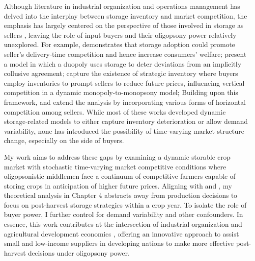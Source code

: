 Although literature in industrial organization and operations management has delved into the interplay between storage inventory and market competition, the emphasis has largely centered on the perspective of those involved in storage as sellers \citep{leng2005game}, leaving the role of input buyers and their oligopsony power relatively unexplored. For example, \cite{li1992role} demonstrates that storage adoption could promote seller's delivery-time competition and hence increase consumers' welfare; \cite{rotemberg1989cyclical} present a model in which a duopoly uses storage to deter deviations from an implicitly collusive agreement; \cite{anand2008strategic} capture the existence of strategic inventory where buyers employ inventories to prompt sellers to reduce future prices, influencing vertical competition in a dynamic monopoly-to-monopsony model; Building upon this framework, \cite{hu2021strategic} and \cite{cai2021supply} extend the analysis by incorporating various forms of horizontal competition among sellers. While most of these works developed dynamic storage-related models to either capture inventory deterioration or allow demand variability, none has introduced the possibility of time-varying market structure change, especially on the side of buyers. 


My work aims to address these gaps by examining a dynamic storable crop market with stochastic time-varying market competitive conditions where oligopsonistic middlemen face a continuum of competitive farmers capable of storing crops in anticipation of higher future prices. Aligning with \cite{porteous2019high} and \cite{ruhinduka2020smallholder}, my theoretical analysis in Chapter 4 abstracts away from production decisions to focus on post-harvest storage strategies within a crop year. To isolate the role of buyer power, I further control for demand variability and other confounders. In essence, this work contributes at the intersection of industrial organization and agricultural development economics \citep{bellemare2022agricultural}, offering an innovative approach to assist small and low-income suppliers in developing nations to make more effective post-harvest decisions under oligopsony power.
